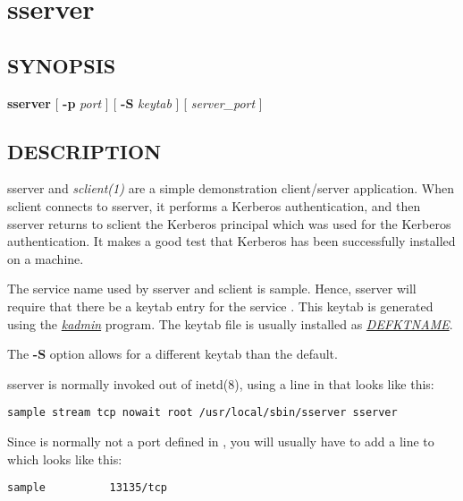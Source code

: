 \documentclass[letterpaper,10pt,english]{sphinxmanual}
\begin{document}
\section{sserver}
\label{admin/admin_commands/sserver:sserver-8}\label{admin/admin_commands/sserver::doc}\label{admin/admin_commands/sserver:sserver}

\subsection{SYNOPSIS}
\label{admin/admin_commands/sserver:synopsis}
\textbf{sserver}
{[} \textbf{-p} \emph{port} {]}
{[} \textbf{-S} \emph{keytab} {]}
{[} \emph{server\_port} {]}


\subsection{DESCRIPTION}
\label{admin/admin_commands/sserver:description}
sserver and \emph{sclient(1)} are a simple demonstration client/server
application.  When sclient connects to sserver, it performs a Kerberos
authentication, and then sserver returns to sclient the Kerberos
principal which was used for the Kerberos authentication.  It makes a
good test that Kerberos has been successfully installed on a machine.

The service name used by sserver and sclient is sample.  Hence,
sserver will require that there be a keytab entry for the service
.  This keytab is generated
using the {\hyperref[admin/admin_commands/kadmin_local:kadmin-1]{\emph{kadmin}}} program.  The keytab file is usually
installed as {\hyperref[mitK5defaults:paths]{\emph{DEFKTNAME}}}.

The \textbf{-S} option allows for a different keytab than the default.

sserver is normally invoked out of inetd(8), using a line in
 that looks like this:

\begin{Verbatim}[commandchars=\\\{\}]
sample stream tcp nowait root /usr/local/sbin/sserver sserver
\end{Verbatim}

Since  is normally not a port defined in ,
you will usually have to add a line to  which looks
like this:

\begin{Verbatim}[commandchars=\\\{\}]
sample          13135/tcp
\end{Verbatim}
\end{document}
